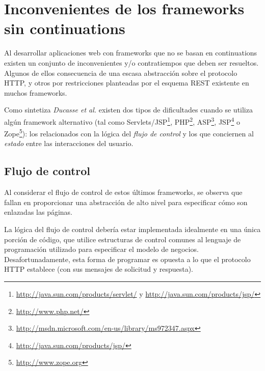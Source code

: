 \section{Inconvenientes de los frameworks sin continuations}

Al desarrollar aplicaciones web con frameworks que no se basan en continuations existen un conjunto de inconvenientes y/o contratiempos que deben ser resueltos. Algunos de ellos consecuencia de una escasa abstracción sobre el protocolo HTTP, y otros por restricciones planteadas por el esquema REST\cite[p.~76]{Fielding00} existente en muchos frameworks.


Como sintetiza \emph{Ducasse et al.}\cite[p.~234]{Ducasse04} existen dos tipos de dificultades cuando se utiliza algún framework alternativo (tal como Servlets/JSP\footnote{\url{http://java.sun.com/products/servlet/} y \url{http://java.sun.com/products/jsp/}}, PHP\footnote{\url{http://www.php.net/}}, ASP\footnote{\url{http://msdn.microsoft.com/en-us/library/ms972347.aspx}}, JSP\footnote{\url{http://java.sun.com/products/jsp/}} o Zope\footnote{\url{http://www.zope.org}}): los relacionados con la lógica del \emph{flujo de control} y los que conciernen al \emph{estado} entre las interacciones del usuario.


\subsection{Flujo de control}

Al considerar el flujo de control de estos últimos frameworks, se observa que fallan en proporcionar una abstracción de alto nivel para especificar cómo son enlazadas las páginas.

La lógica del flujo de control debería estar implementada idealmente en una única porción de código, que utilice estructuras de control comunes al lenguaje de programación utilizado para especificar el modelo de negocios. Desafortunadamente, esta forma de programar es opuesta a lo que el protocolo HTTP establece (con sus mensajes de solicitud y respuesta).


